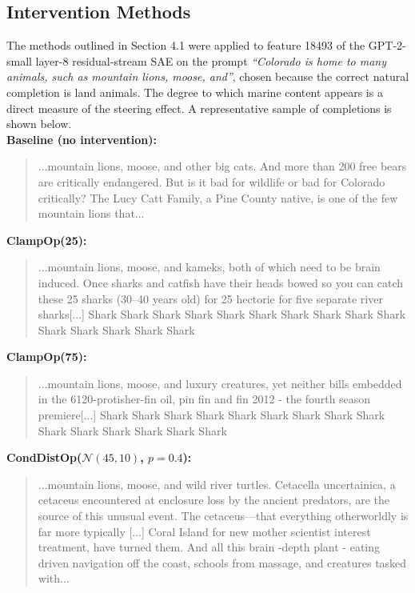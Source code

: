 \documentclass{article}
\begin{document}
\subsection{Intervention Methods}

The methods outlined in Section 4.1 were applied to feature 18493 of the GPT-2-small layer-8 residual-stream SAE on the prompt \textit{``Colorado is home to many animals, such as mountain lions, moose, and''}, chosen because the correct natural completion is land animals. The degree to which marine content appears is a direct measure of the steering effect. A representative sample of completions is shown below.\\

\noindent\textbf{Baseline (no intervention):}
\begin{quote}
\small\ttfamily
...mountain lions, moose, and other big cats. And more than 200 free bears are critically endangered. But is it bad for wildlife or bad for Colorado critically? The Lucy Catt Family, a Pine County native, is one of the few mountain lions that...
\end{quote}

\noindent\textbf{ClampOp(25):}
\begin{quote}
\small\ttfamily
...mountain lions, moose, and kameks, both of which need to be brain induced. Once sharks and catfish have their heads bowed so you can catch these 25 sharks (30--40 years old) for 25 hectorie for five separate river sharks[...] Shark Shark Shark Shark Shark Shark Shark Shark Shark Shark Shark Shark Shark Shark Shark
\end{quote}

\noindent\textbf{ClampOp(75):}
\begin{quote}
\small\ttfamily
...mountain lions, moose, and luxury creatures, yet neither bills embedded in the 6120-protisher-fin oil, pin fin and fin 2012 - the fourth season premiere[...] Shark Shark Shark Shark Shark Shark Shark Shark Shark Shark Shark Shark Shark Shark Shark
\end{quote}

\noindent\textbf{CondDistOp($\mathcal{N}(45, 10)$, $p=0.4$):}
\begin{quote}
\small\ttfamily
...mountain lions, moose, and wild river turtles. Cetacella uncertainica, a cetaceus encountered at enclosure loss by the ancient predators, are the source of this unusual event. The cetaceus---that everything otherworldly is far more typically [...] Coral Island for new mother scientist interest treatment, have turned them. And all this brain -depth plant - eating driven navigation off the coast, schools from massage, and creatures tasked with...
\end{quote}
\end{document}
